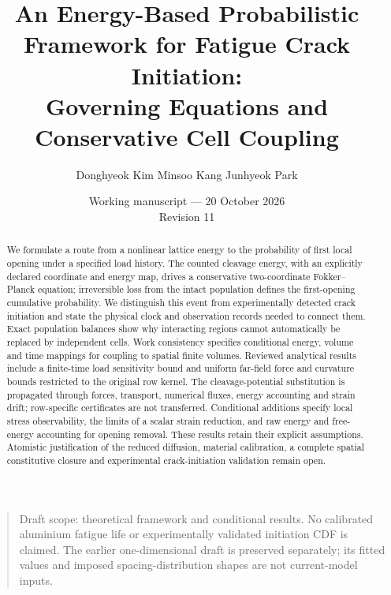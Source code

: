 \documentclass[11pt]{article}
\title{An Energy-Based Probabilistic Framework for Fatigue Crack Initiation:\\
Governing Equations and Conservative Cell Coupling}
\author{Donghyeok Kim \quad Minsoo Kang \quad Junhyeok Park}
\date{Working manuscript --- 20 October 2026\\Revision 11}
\begin{document}
\maketitle
\begin{abstract}
We formulate a route from a nonlinear lattice energy to the probability of
first local opening under a specified load history. The counted cleavage energy, with an explicitly declared coordinate and energy map,
drives a conservative two-coordinate Fokker--Planck equation; irreversible loss from
the intact population defines the first-opening cumulative probability.
We distinguish this event from experimentally detected crack initiation and
state the physical clock and observation records needed to connect them.
Exact population balances show why interacting regions cannot automatically
be replaced by independent cells. Work consistency specifies conditional
energy, volume and time mappings for coupling to spatial finite volumes.
Reviewed analytical results include a finite-time load sensitivity bound
and uniform far-field force and curvature bounds restricted to the original row kernel.
The cleavage-potential substitution is propagated through forces, transport, numerical
fluxes, energy accounting and strain drift; row-specific certificates are not transferred.
Conditional additions specify local stress observability, the limits of a scalar strain reduction,
and raw energy and free-energy accounting for opening removal.
These results retain their explicit assumptions. Atomistic justification of
the reduced diffusion, material calibration, a complete spatial constitutive
closure and experimental crack-initiation validation remain open.
\end{abstract}
\begin{quote}\small
Draft scope: theoretical framework and conditional results. No calibrated
aluminium fatigue life or experimentally validated initiation CDF is claimed.
The earlier one-dimensional draft is preserved separately; its fitted values
and imposed spacing-distribution shapes are not current-model inputs.
\end{quote}

\end{document}
